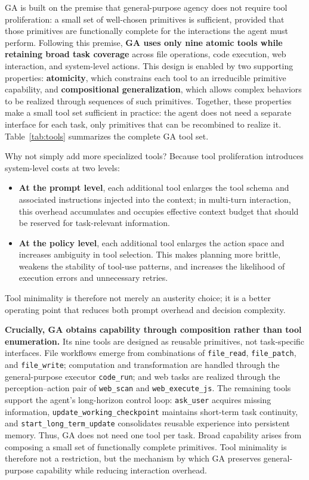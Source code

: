 GA is built on the premise that general-purpose agency does not require tool proliferation: a small set of well-chosen primitives is sufficient, provided that those primitives are functionally complete for the interactions the agent must perform. Following this premise, \textbf{GA uses only nine atomic tools while retaining broad task coverage} across file operations, code execution, web interaction, and system-level actions. This design is enabled by two supporting properties: \textbf{atomicity}, which constrains each tool to an irreducible primitive capability, and \textbf{compositional generalization}, which allows complex behaviors to be realized through sequences of such primitives. Together, these properties make a small tool set sufficient in practice: the agent does not need a separate interface for each task, only primitives that can be recombined to realize it. Table~\ref{tab:tools} summarizes the complete GA tool set.

Why not simply add more specialized tools? Because tool proliferation introduces system-level costs at two levels:
\begin{itemize}
    \item \textbf{At the prompt level}, each additional tool enlarges the tool schema and associated instructions injected into the context; in multi-turn interaction, this overhead accumulates and occupies effective context budget that should be reserved for task-relevant information.

    \item \textbf{At the policy level}, each additional tool enlarges the action space and increases ambiguity in tool selection. This makes planning more brittle, weakens the stability of tool-use patterns, and increases the likelihood of execution errors and unnecessary retries.
\end{itemize}
Tool minimality is therefore not merely an austerity choice; it is a better operating point that reduces both prompt overhead and decision complexity.

\textbf{Crucially, GA obtains capability through composition rather than tool enumeration.} Its nine tools are designed as reusable primitives, not task-specific interfaces. File workflows emerge from combinations of \texttt{file\_read}, \texttt{file\_patch}, and \texttt{file\_write}; computation and transformation are handled through the general-purpose executor \texttt{code\_run}; and web tasks are realized through the perception--action pair of \texttt{web\_scan} and \texttt{web\_execute\_js}. The remaining tools support the agent's long-horizon control loop: \texttt{ask\_user} acquires missing information, \texttt{update\_working\_checkpoint} maintains short-term task continuity, and \texttt{start\_long\_term\_update} consolidates reusable experience into persistent memory. Thus, GA does not need one tool per task. Broad capability arises from composing a small set of functionally complete primitives. Tool minimality is therefore not a restriction, but the mechanism by which GA preserves general-purpose capability while reducing interaction overhead.


